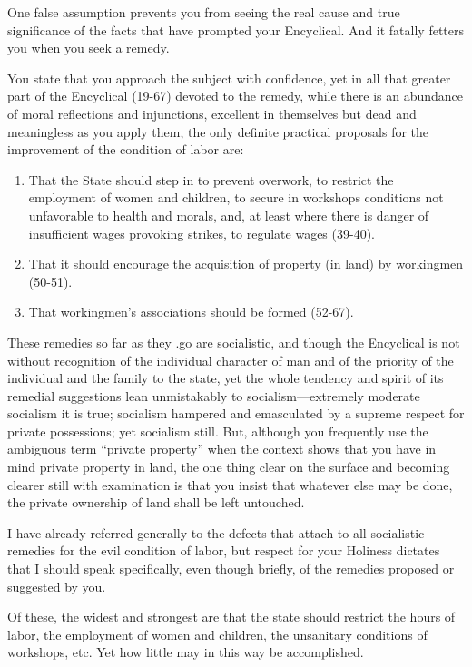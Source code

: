 \documentclass{book}
\begin{document}
One false assumption prevents you from seeing the real cause and true significance of the facts that have prompted your Encyclical. And it fatally fetters you when you seek a remedy.

You state that you approach the subject with confidence, yet in all that greater part of the Encyclical (19-67) devoted to the remedy, while there is an abundance of moral reflections and injunctions, excellent in themselves but dead and meaningless as you apply them, the only definite practical proposals for the improvement of the condition of labor are:

\begin{enumerate}
	\item That the State should step in to prevent overwork, to restrict the employment of women and children, to secure in workshops conditions not unfavorable to health and morals, and, at least where there is danger of insufficient wages provoking strikes, to regulate wages (39-40).


	\item That it should encourage the acquisition of property (in land) by workingmen (50-51).


	\item That workingmen’s associations should be formed (52-67).



\end{enumerate}
These remedies so far as they .go are socialistic, and though the Encyclical is not without recognition of the individual character of man and of the priority of the individual and the family to the state, yet the whole tendency and spirit of its remedial suggestions lean unmistakably to socialism—extremely moderate socialism it is true; socialism hampered and emasculated by a supreme respect for private possessions; yet socialism still. But, although you frequently use the ambiguous term “private property” when the context shows that you have in mind private property in land, the one thing clear on the surface and becoming clearer still with examination is that you insist that whatever else may be done, the private ownership of land shall be left untouched.

I have already referred generally to the defects that attach to all socialistic remedies for the evil condition of labor, but respect for your Holiness dictates that I should speak specifically, even though briefly, of the remedies proposed or suggested by you.

Of these, the widest and strongest are that the state should restrict the hours of labor, the employment of women and children, the unsanitary conditions of workshops, etc. Yet how little may in this way be accomplished.
\end{document}

